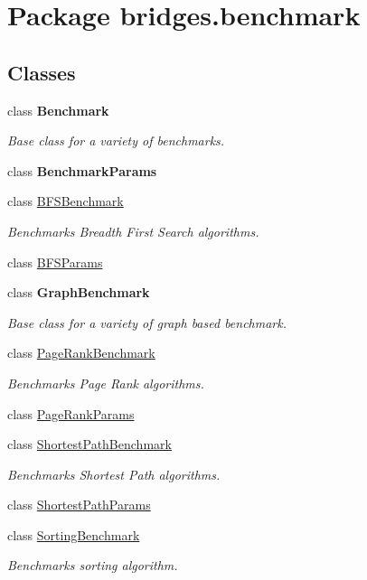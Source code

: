\hypertarget{namespacebridges_1_1benchmark}{}\section{Package bridges.\+benchmark}
\label{namespacebridges_1_1benchmark}
\subsection*{Classes}
\begin{DoxyCompactItemize}
\item 
class {\bfseries Benchmark}
\begin{DoxyCompactList}\small\item\em Base class for a variety of benchmarks. \end{DoxyCompactList}\item 
class {\bfseries Benchmark\+Params}
\item 
class \hyperlink{classbridges_1_1benchmark_1_1_b_f_s_benchmark}{B\+F\+S\+Benchmark}
\begin{DoxyCompactList}\small\item\em Benchmarks Breadth First Search algorithms. \end{DoxyCompactList}\item 
class \hyperlink{classbridges_1_1benchmark_1_1_b_f_s_params}{B\+F\+S\+Params}
\item 
class {\bfseries Graph\+Benchmark}
\begin{DoxyCompactList}\small\item\em Base class for a variety of graph based benchmark. \end{DoxyCompactList}\item 
class \hyperlink{classbridges_1_1benchmark_1_1_page_rank_benchmark}{Page\+Rank\+Benchmark}
\begin{DoxyCompactList}\small\item\em Benchmarks Page Rank algorithms. \end{DoxyCompactList}\item 
class \hyperlink{classbridges_1_1benchmark_1_1_page_rank_params}{Page\+Rank\+Params}
\item 
class \hyperlink{classbridges_1_1benchmark_1_1_shortest_path_benchmark}{Shortest\+Path\+Benchmark}
\begin{DoxyCompactList}\small\item\em Benchmarks Shortest Path algorithms. \end{DoxyCompactList}\item 
class \hyperlink{classbridges_1_1benchmark_1_1_shortest_path_params}{Shortest\+Path\+Params}
\item 
class \hyperlink{classbridges_1_1benchmark_1_1_sorting_benchmark}{Sorting\+Benchmark}
\begin{DoxyCompactList}\small\item\em Benchmarks sorting algorithm. \end{DoxyCompactList}\end{DoxyCompactItemize}
